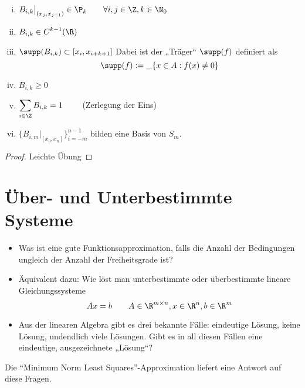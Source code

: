 \documentclass[11pt]{scrbook}
\begin{document}
\begin{st}[Eigenschaften]
	\label{1.36}
	\begin{enumerate}[i)]
		\item
			$\displaystyle B_{i,k}\big|_{(x_j,x_{j+1})} \in \P_k \qquad \forall i,j\in \Z, k\in \N_0$
		\item
			$\displaystyle B_{i,k} \in C^{k-1}(\R)$
		\item
			$\displaystyle \supp (B_{i,k}) \subset [x_i,x_{i+k+1}]$
			Dabei ist der „Träger“ $\supp (f)$ definiert als
			\[
				\supp(f) := \_{\{x\in A : f(x) \neq 0\}}
			\]
		\item
			$\displaystyle B_{i,k} \ge 0$
		\item
			$\displaystyle \sum_{i\in \Z} B_{i,k} = 1 \qquad$ (Zerlegung der Eins)
		\item
			$\displaystyle \{B_{i,m}\big|_{[x_0,x_n]}\}_{i=-m}^{n-1}$ bilden eine Basis von $S_m$.
	\end{enumerate}
	\begin{proof}
		Leichte Übung
	\end{proof}
\end{st}


\section{Über- und Unterbestimmte Systeme}


\begin{itemize}
	\item
		Was ist eine gute Funktionsapproximation, falls die Anzahl der Bedingungen ungleich der Anzahl der Freiheitsgrade ist?
	\item
		Äquivalent dazu: Wie löst man unterbestimmte oder überbestimmte lineare Gleichungssysteme
		\[
			Ax=b \qquad A\in \R^{m\times n}, x\in \R^n, b\in \R^m
		\]
	\item
		Aus der linearen Algebra gibt es drei bekannte Fälle: eindeutige Lösung, keine Lösung, undendlich viele Lösungen.
		Gibt es in all diesen Fällen eine eindeutige, ausgezeichnete „Lösung“?
\end{itemize}

Die “Minimum Norm Least Squares”-Approximation liefert eine Antwort auf diese Fragen.
\end{document}
